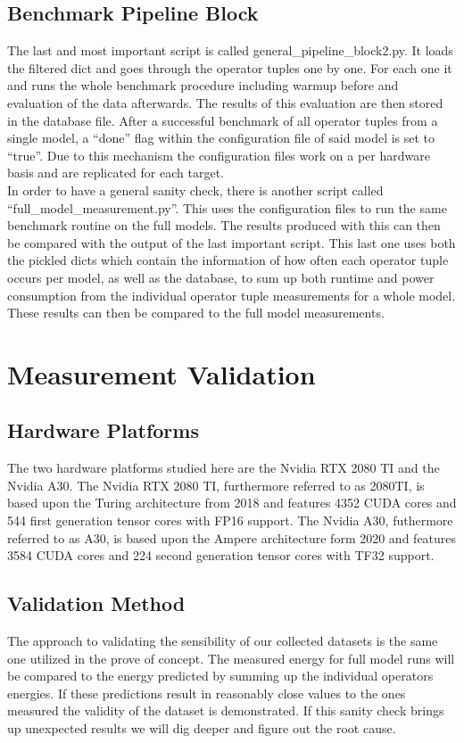 \documentclass[conference]{IEEEtran}
\begin{document}
\subsection{Benchmark Pipeline Block}
The last and most important script is called general\_pipeline\_block2.py. It loads the filtered dict and goes through the operator tuples one by one. For each one it and runs the whole benchmark procedure including warmup before and evaluation of the data afterwards. The results of this evaluation are then stored in the database file. After a successful benchmark of all operator tuples from a single model, a “done” flag within the configuration file of said model is set to “true”. Due to this mechanism the configuration files work on a per hardware basis and are replicated for each target. \\
In order to have a general sanity check, there is another script called “full\_model\_measurement.py”. This uses the configuration files to run the same benchmark routine on the full models. The results produced with this can then be compared with the output of the last important script. This last one uses both the pickled dicts which contain the information of how often each operator tuple occurs per model, as well as the database, to sum up both runtime and power consumption from the individual operator tuple measurements for a whole model. These results can then be compared to the full model measurements.


\section{Measurement Validation}

\subsection{Hardware Platforms}
The two hardware platforms studied here are the Nvidia RTX 2080 TI and the Nvidia A30. The Nvidia RTX 2080 TI, furthermore referred to as 2080TI, is based upon the Turing architecture from 2018 and features 4352 CUDA cores and 544 first generation tensor cores with FP16 support. The Nvidia A30, futhermore referred to as A30, is based upon the Ampere architecture form 2020 and features 3584 CUDA cores and 224 second generation tensor cores with TF32 support.\\

\subsection{Validation Method}
The approach to validating the sensibility of our collected datasets is the same one utilized in the prove of concept. The measured energy for full model runs will be compared to the energy predicted by summing up the individual operators energies. If these predictions result in reasonably close values to the ones measured the validity of the dataset is demonstrated. If this sanity check brings up unexpected results we will dig deeper and figure out the root cause.
\end{document}
